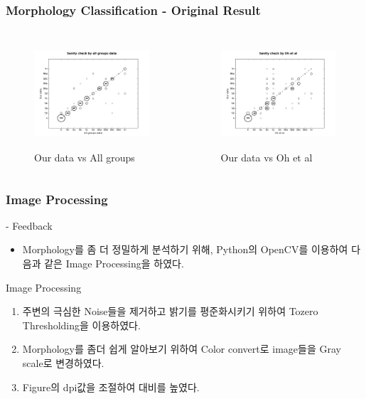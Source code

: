 \documentclass[xcolor={dvipsnames,table}]{beamer}
\begin{document}
\begin{frame}
  \frametitle{Morphology Classification - Original Result}
  \begin{columns}[t]
   \begin{figure}
    \centering
    \includegraphics[width=6cm, height=4cm]{Sanity.png}
    \caption{Our data vs All groups }
   \end{figure}
   \begin{figure}
    \centering
    \includegraphics[width=6cm, height=4cm]{Sanity_oh.png}
    \caption{Our data vs Oh et al}
   \end{figure}
  \end{columns}

  \centering
 
\end{frame}

\begin{frame}
  \frametitle{Image Processing}
  
  - Feedback
  \begin{itemize}
   \item Morphology를 좀 더 정밀하게 분석하기 위해, Python의 OpenCV를 이용하여 다음과 같은 Image Processing을 하였다.
  \end{itemize}
  \begin{block}{Image Processing}
   \begin{enumerate}
   \item 주변의 극심한 Noise들을 제거하고 밝기를 평준화시키기 위하여 Tozero Thresholding을 이용하였다.
   \item Morphology를 좀더 쉽게 알아보기 위하여 Color convert로 image들을 Gray scale로 변경하였다.
   \item Figure의 dpi값을 조절하여 대비를 높였다.
   \end{enumerate}
  \end{block}

\end{frame}
\end{document}
